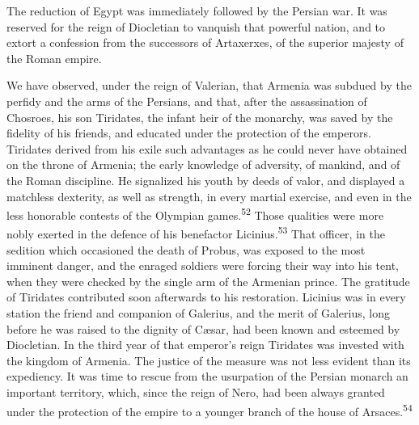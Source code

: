 
The reduction of Egypt was immediately followed by the Persian
war. It was reserved for the reign of Diocletian to vanquish that
powerful nation, and to extort a confession from the successors
of Artaxerxes, of the superior majesty of the Roman empire.

We have observed, under the reign of Valerian, that Armenia was
subdued by the perfidy and the arms of the Persians, and that,
after the assassination of Chosroes, his son Tiridates, the
infant heir of the monarchy, was saved by the fidelity of his
friends, and educated under the protection of the emperors.
Tiridates derived from his exile such advantages as he could
never have obtained on the throne of Armenia; the early knowledge
of adversity, of mankind, and of the Roman discipline. He
signalized his youth by deeds of valor, and displayed a matchless
dexterity, as well as strength, in every martial exercise, and
even in the less honorable contests of the Olympian games.\textsuperscript{52}
Those qualities were more nobly exerted in the defence of his
benefactor Licinius.\textsuperscript{53} That officer, in the sedition which
occasioned the death of Probus, was exposed to the most imminent
danger, and the enraged soldiers were forcing their way into his
tent, when they were checked by the single arm of the Armenian
prince. The gratitude of Tiridates contributed soon afterwards to
his restoration. Licinius was in every station the friend and
companion of Galerius, and the merit of Galerius, long before he
was raised to the dignity of Cæsar, had been known and esteemed
by Diocletian. In the third year of that emperor’s reign
Tiridates was invested with the kingdom of Armenia. The justice
of the measure was not less evident than its expediency. It was
time to rescue from the usurpation of the Persian monarch an
important territory, which, since the reign of Nero, had been
always granted under the protection of the empire to a younger
branch of the house of Arsaces.\textsuperscript{54}



